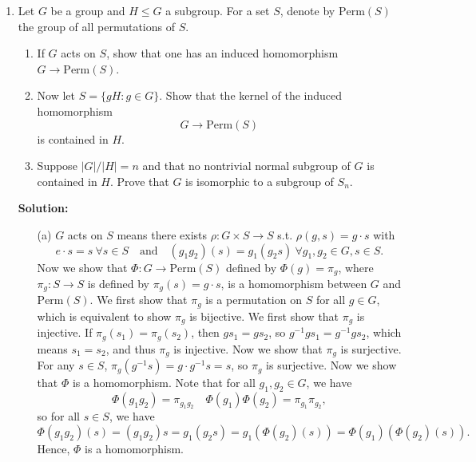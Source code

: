 \documentclass[12pt]{article}
\begin{document}
\begin{enumerate}
    \item Let \( G \) be a group and \( H \le G \) a subgroup. For a set \( S \), denote by \( \mathrm{Perm}(S) \) the group of all permutations of \( S \).

    \begin{enumerate}[label=(\alph*)]
        \item If \( G \) acts on \( S \), show that one has an induced homomorphism \( G \to \mathrm{Perm}(S) \).

        \item Now let \( S = \{ gH : g \in G \} \). Show that the kernel of the induced homomorphism
        \[
            G \to \mathrm{Perm}(S)
        \]
        is contained in \( H \).

        \item Suppose \( |G|/|H| = n \) and that no nontrivial normal subgroup of \( G \) is contained in \( H \). Prove that \( G \) is isomorphic to a subgroup of \( S_n \).
    \end{enumerate}
    \textbf{Solution:} 
    \begin{itemize}
        \item [(a)] \(G\) acts on \(S\) means there exists \(\rho :G \times S \to S\) s.t. \(\rho (g, s) = g \cdot s\) with 
        \[
            e \cdot s = s \ \forall s \in S \quad \text{and} \quad (g_1 g_2)(s) = g_1(g_2 s) \ \forall g_1, g_2 \in G, s \in S.
        \]
        Now we show that \(\Phi : G \to \mathrm{Perm}(S) \) defined by \(\Phi (g) = \pi _g \), where \(\pi _g : S \to S\) is defined by \(\pi _g(s) = g \cdot s\), is a homomorphism between \(G\) and \(\mathrm{Perm}(S) \). We first show that \(\pi _g\) is a permutation on \(S\) for all \(g \in G\), which is equivalent to show \(\pi _g\) is bijective. We first show that \(\pi _g\) is injective. If \(\pi _g(s_1) = \pi _g(s_2)\), then \(g s_1 = g s_2\), so \(g^{-1} g s_1 = g^{-1} g s_2\), which means \(s_1 = s_2\), and thus \(\pi _g\) is injective. Now we show that \(\pi _g\) is surjective. For any \(s \in S\), \(\pi _g \left( g^{-1} s \right) = g \cdot g^{-1} s = s\), so \(\pi _g\) is surjective. Now we show that \(\Phi \) is a homomorphism. Note that for all \(g_1, g_2 \in G\), we have 
        \[
            \Phi (g_1 g_2) = \pi _{g_1 g_2} \quad \Phi (g_1) \Phi (g_2) = \pi _{g_1} \pi _{g_2},
        \] so for all \(s \in S\), we have 
        \[
            \Phi (g_1 g_2) (s) = (g_1 g_2) s = g_1 (g_2 s) = g_1 \left(  \Phi (g_2) (s) \right)  = \Phi (g_1) \left( \Phi (g_2) (s) \right) .
        \] Hence, \(\Phi \) is a homomorphism.  

\end{itemize}
\end{enumerate}
\end{document}
